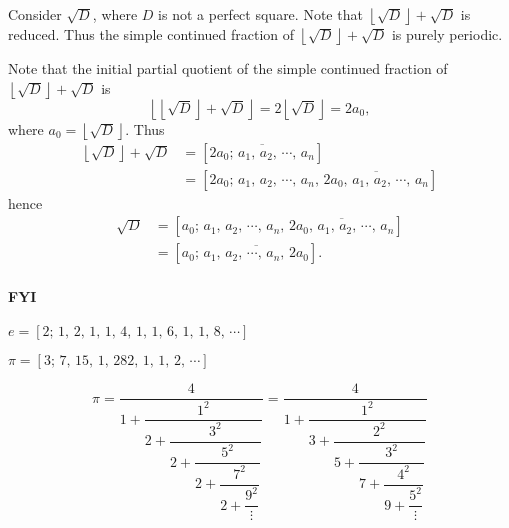 \begin{remark}
    Consider $\sqrt{D}$, where $D$ is not a perfect square. Note that
    $\left\lfloor \sqrt{D}\right\rfloor+\sqrt{D}$ is reduced.
    Thus the simple continued fraction of $\left\lfloor \sqrt{D}\right\rfloor+\sqrt{D}$
    is purely periodic.

    Note that the initial partial quotient of the simple continued fraction of
    $\left\lfloor \sqrt{D}\right\rfloor+\sqrt{D}$ is
    \[
        \left\lfloor\left\lfloor \sqrt{D}\right\rfloor+\sqrt{D}\right\rfloor
        =2\left\lfloor \sqrt{D}\right\rfloor
        =2a_0,
    \]
    where $a_0=\left\lfloor \sqrt{D}\right\rfloor$.
    Thus
    \begin{align*}
        \left\lfloor \sqrt{D}\right\rfloor+\sqrt{D}
        &= \left[ \overline{2a_0;\,a_1,\,a_2,\,\cdots,\,a_n} \right] \\
        &= \left[ 2a_0;\,a_1,\,a_2,\,\cdots,\,a_n,\,\overline{2a_0, \,a_1,\,a_2,\,\cdots,\,a_n} \right]
    \end{align*}
    hence
    \begin{align*}
        \sqrt{D}
        &= \left[ a_0;\,a_1,\,a_2,\,\cdots,\,a_n,\,\overline{2a_0, \,a_1,\,a_2,\,\cdots,\,a_n} \right] \\
        &= \left[ a_0;\,\overline{a_1,\,a_2,\,\cdots,\,a_n,\,2a_0} \right].
    \end{align*}
\end{remark}

\paragraph{FYI} $e=\left[ 2;\,1,\,2,\,1,\,1,\,4,\,1,\,1,\,6,\,1,\,1,\,8,\,\cdots \right]$

$\pi = \left[ 3;\,7,\,15,\,1,\,282,\,1,\,1,\,2,\,\cdots \right]$

\[
    \pi = \dfrac{4}{1+\dfrac{1^2}{2+\dfrac{3^2}{2+\dfrac{5^2}{2+\dfrac{7^2}{2+\dfrac{9^2}{\vdots}}}}}}
    = \dfrac{4}{1+\dfrac{1^2}{3+\dfrac{2^2}{5+\dfrac{3^2}{7+\dfrac{4^2}{9+\dfrac{5^2}{\vdots}}}}}}
\]